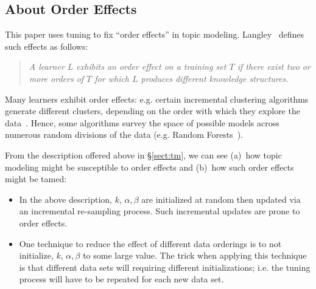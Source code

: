 \documentclass[10pt,conference]{IEEEtran}
\newcommand{\bi}{\begin{itemize}}
\newcommand{\ei}{\end{itemize}}
\theoremstyle{break}
\begin{document}
\subsection{About Order Effects}

\noindent
This paper uses tuning to fix ``order effects'' in topic modeling. Langley~\cite{GENNARI198911} defines such effects as follows:
\begin{quote}
{\em A learner $L$ exhibits an order effect on a training set  $T$ if there exist
two or more orders of $T$ for which $L$ produces different knowledge structures.}
\end{quote}
Many learners exhibit order effects: e.g. certain incremental clustering algorithms generate different
clusters, depending on the order with which they explore the data~\cite{GENNARI198911}.
Hence, some algorithms survey the space of possible models across numerous
random divisions of the data (e.g. Random Forests~\cite{Breiman2001}).

From the description offered above in \S\ref{sect:tm},
we can see (a)~how topic modeling might be susceptible to order effects and (b)~how such order
effects might be tamed:
\bi
\item
  In the above description, $k$, $\alpha,\beta$ are initialized at random
then updated via an incremental re-sampling process. Such incremental updates are prone to order effects.
\item
  One technique to reduce the effect of different data orderings is to not initialize, $k$, $\alpha,\beta$ to some
  large value. The trick when applying this technique is that different data sets will requiring different
  initializations; i.e. the tuning process will have to be repeated for each new data set.
\ei
  





\end{document}
